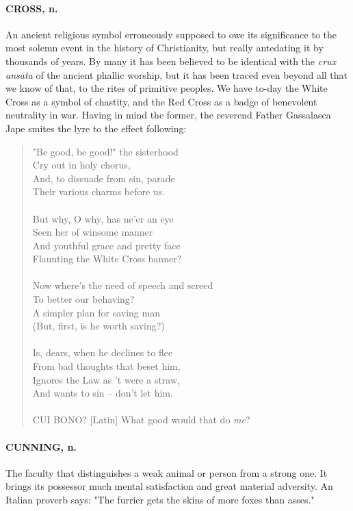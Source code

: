 \documentclass[11pt]{article}
\begin{document}
\paragraph{CROSS, n.}  An ancient religious symbol erroneously supposed to owe its
significance to the most solemn event in the history of Christianity,
but really antedating it by thousands of years.  By many it has been
believed to be identical with the {\em crux ansata} of the ancient phallic
worship, but it has been traced even beyond all that we know of that,
to the rites of primitive peoples.  We have to-day the White Cross as
a symbol of chastity, and the Red Cross as a badge of benevolent
neutrality in war.  Having in mind the former, the reverend Father
Gassalasca Jape smites the lyre to the effect following:

\begin{quote}   "Be good, be good!" the sisterhood \\
      Cry out in holy chorus, \\
  And, to dissuade from sin, parade \\
      Their various charms before us. \\
 \\
  But why, O why, has ne'er an eye \\
      Seen her of winsome manner \\
  And youthful grace and pretty face \\
      Flaunting the White Cross banner? \\
 \\
  Now where's the need of speech and screed \\
      To better our behaving? \\
  A simpler plan for saving man \\
      (But, first, is he worth saving?) \\
 \\
  Is, dears, when he declines to flee \\
      From bad thoughts that beset him, \\
  Ignores the Law as 't were a straw, \\
      And wants to sin -- don't let him. \\
 \\
CUI BONO?  [Latin]  What good would that do {\em me}? \end{quote}

\paragraph{CUNNING, n.}  The faculty that distinguishes a weak animal or person
from a strong one.  It brings its possessor much mental satisfaction
and great material adversity.  An Italian proverb says:  "The furrier
gets the skins of more foxes than asses."
\end{document}
